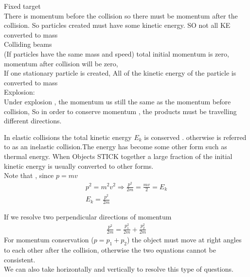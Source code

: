 \documentclass[a4paper]{article}
\begin{document}
\begin{defi}
Fixed target\\
There is momentum before the collision so there must be momentum after the collision. So particles created must have some kinetic energy. SO not all KE converted to mass\\

Colliding beams\\
(If particles have the same mass and speed) total initial momentum is zero, momentum after collision will be zero,\\

If one stationary particle is created, All of the kinetic energy of the particle is converted to mass\\

Explosion:\\
Under explosion , the momentum us still the same as the momentum before collision, So in order to conserve momentum , the products must be travelling different directions.
\end{defi}

\begin{defi}
In elastic collisions the total kinetic energy $E_k$ is conserved . otherwise is referred to as an inelastic collision.The energy has become some other form such as thermal energy. When Objects STICK together a large fraction of the initial kinetic energy is usually converted to other forms.\\
Note that , since $p=mv$
\begin{align*}
    p^2=m^2v^2 \Rightarrow \frac{p^2}{2m}=\frac{mv}{2}=E_k\\
    E_k=\frac{p^2}{2m}
\end{align*}
\end{defi}

\begin{defi}
If we resolve two perpendicular directions of momentum
\begin{align*}
    \frac{p^2}{2m}=\frac{p_1^2}{2m}+\frac{p_2^2}{2m}
\end{align*}
For momentum conservation ($p=p_1+p_2$) the object must move at right angles to each other after the collision, otherwise the two equations cannot be consistent.\\

We can also take horizontally and vertically to resolve this type of questions.
\end{defi}
\end{document}
